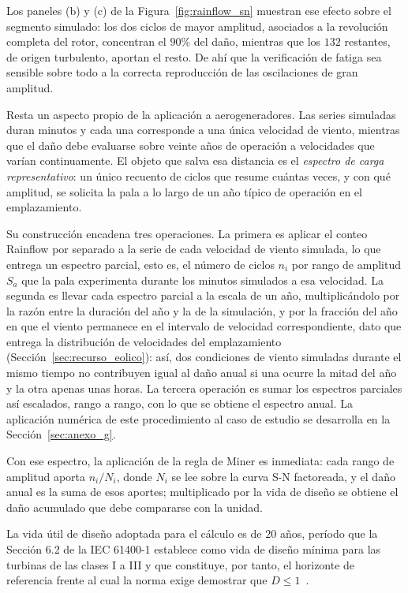 \newpage
Los paneles (b) y (c) de la Figura~\ref{fig:rainflow_sn} muestran ese efecto sobre el segmento simulado: los dos ciclos de mayor amplitud, asociados a la revolución completa del rotor, concentran el $90\%$ del daño, mientras que los $132$ restantes, de origen turbulento, aportan el resto. De ahí que la verificación de fatiga sea sensible sobre todo a la correcta reproducción de las oscilaciones de gran amplitud.

Resta un aspecto propio de la aplicación a aerogeneradores. Las series simuladas duran minutos y cada una corresponde a una única velocidad de viento, mientras que el daño debe evaluarse sobre veinte años de operación a velocidades que varían continuamente. El objeto que salva esa distancia es el \textit{espectro de carga representativo}: un único recuento de ciclos que resume cuántas veces, y con qué amplitud, se solicita la pala a lo largo de un año típico de operación en el emplazamiento.

Su construcción encadena tres operaciones. La primera es aplicar el conteo Rainflow por separado a la serie de cada velocidad de viento simulada, lo que entrega un espectro parcial, esto es, el número de ciclos $n_i$ por rango de amplitud $S_a$ que la pala experimenta durante los minutos simulados a esa velocidad. La segunda es llevar cada espectro parcial a la escala de un año, multiplicándolo por la razón entre la duración del año y la de la simulación, y por la fracción del año en que el viento permanece en el intervalo de velocidad correspondiente, dato que entrega la distribución de velocidades del emplazamiento (Sección~\ref{sec:recurso_eolico}): así, dos condiciones de viento simuladas durante el mismo tiempo no contribuyen igual al daño anual si una ocurre la mitad del año y la otra apenas unas horas. La tercera operación es sumar los espectros parciales así escalados, rango a rango, con lo que se obtiene el espectro anual. La aplicación numérica de este procedimiento al caso de estudio se desarrolla en la Sección~\ref{sec:anexo_g}.

Con ese espectro, la aplicación de la regla de Miner es inmediata: cada rango de amplitud aporta $n_i/N_i$, donde $N_i$ se lee sobre la curva S-N factoreada, y el daño anual es la suma de esos aportes; multiplicado por la vida de diseño se obtiene el daño acumulado que debe compararse con la unidad.

La vida útil de diseño adoptada para el cálculo es de $20$ años, período que la Sección 6.2 de la IEC 61400-1 establece como vida de diseño mínima para las turbinas de las clases I a III y que constituye, por tanto, el horizonte de referencia frente al cual la norma exige demostrar que $D \leq 1$~\parencite*{IEC61400-1}.

